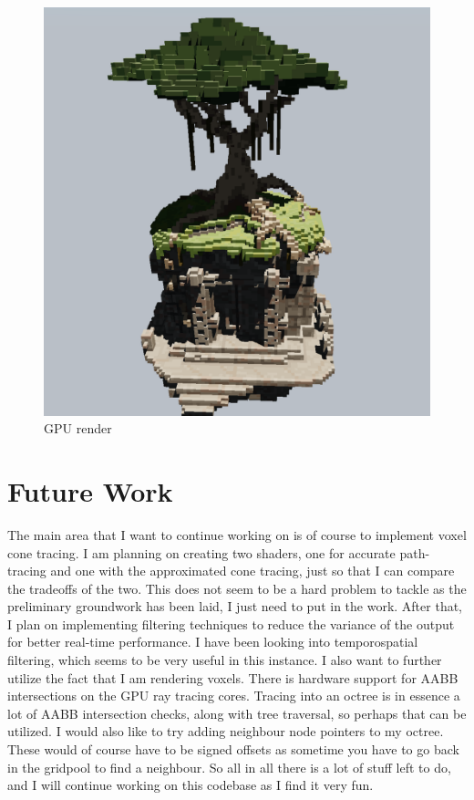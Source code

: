 \begin{figure}
	\centering
	\includegraphics[width=1\linewidth]{gpu-far}
	\caption{GPU render}
	\label{fig:gpu-far}
\end{figure}


\section{Future Work}
The main area that I want to continue working on is of course to implement voxel cone tracing. I am planning on creating two shaders, one for accurate path-tracing and one with the approximated cone tracing, just so that I can compare the tradeoffs of the two. This does not seem to be a hard problem to tackle as the preliminary groundwork has been laid, I just need to put in the work. After that, I plan on implementing filtering techniques to reduce the variance of the output for better real-time performance. I have been looking into temporospatial filtering, which seems to be very useful in this instance. I also want to further utilize the fact that I am rendering voxels. There is hardware support for AABB intersections on the GPU ray tracing cores. Tracing into an octree is in essence a lot of AABB intersection checks, along with tree traversal, so perhaps that can be utilized. I would also like to try adding neighbour node pointers to my octree. These would of course have to be signed offsets as sometime you have to go back in the gridpool to find a neighbour. So all in all there is a lot of stuff left to do, and I will continue working on this codebase as I find it very fun.


